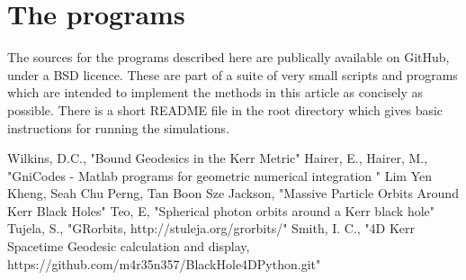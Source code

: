 \documentclass[11pt]{article}
\begin{document}
\section{The programs}

The sources for the programs \cite{m4r35n357} described here are publically available on GitHub, under a BSD licence.  These are part of a suite of very small scripts and programs which are intended to implement the methods in this article as concisely as possible.  There is a short README file in the root directory which gives basic instructions for running the simulations.

\begin{thebibliography}{1}
 Wilkins, D.C., "Bound Geodesics in the Kerr Metric"
  Hairer, E., Hairer, M., "GniCodes - Matlab programs for geometric numerical integration "
 Lim Yen Kheng, Seah Chu Perng, Tan Boon Sze Jackson, "Massive Particle Orbits Around Kerr Black Holes"
 Teo, E, "Spherical photon orbits around a Kerr black hole"
 Tujela, S., "GRorbits, http://stuleja.org/grorbits/"
 Smith, I. C., "4D Kerr Spacetime Geodesic calculation and display, https://github.com/m4r35n357/BlackHole4DPython.git"
\end{thebibliography}
\end{document}
